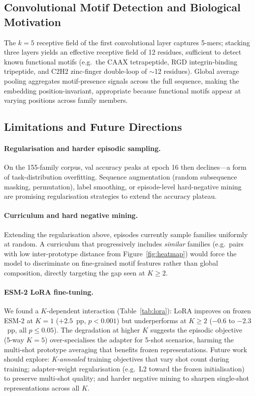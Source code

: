 \documentclass[11pt,a4paper]{article}
\begin{document}
\subsection{Convolutional Motif Detection and Biological Motivation}

The $k=5$ receptive field of the first convolutional layer captures 5-mers;
stacking three layers yields an effective receptive field of 12 residues,
sufficient to detect known functional motifs (e.g.\ the CAAX tetrapeptide, RGD
integrin-binding tripeptide, and C2H2 zinc-finger double-loop of $\sim$12
residues).  Global average pooling aggregates motif-presence signals across the
full sequence, making the embedding position-invariant, appropriate because
functional motifs appear at varying positions across family members.

\subsection{Limitations and Future Directions}
\label{sec:future}

\paragraph{Regularisation and harder episodic sampling.}
On the 155-family corpus, val accuracy peaks at epoch 16 then declines---a form
of task-distribution overfitting.  Sequence augmentation (random subsequence
masking, permutation), label smoothing, or episode-level hard-negative mining
are promising regularisation strategies to extend the accuracy plateau.

\paragraph{Curriculum and hard negative mining.}
Extending the regularisation above, episodes currently sample families uniformly
at random.  A curriculum that progressively includes \emph{similar} families
(e.g.\ pairs with low inter-prototype distance from Figure~\ref{fig:heatmap})
would force the model to discriminate on fine-grained motif features rather than
global composition, directly targeting the gap seen at $K \geq 2$.

\paragraph{ESM-2 LoRA fine-tuning.}
We found a $K$-dependent interaction (Table~\ref{tab:lora}): LoRA improves on
frozen ESM-2 at $K=1$ ($+2.5$~pp, $p < 0.001$) but underperforms at $K \geq 2$
($-0.6$ to $-2.3$~pp, all $p \leq 0.05$).  The degradation at higher $K$
suggests the episodic objective (5-way $K{=}5$) over-specialises the adapter
for 5-shot scenarios, harming the multi-shot prototype averaging that benefits
frozen representations.  Future work should explore: \emph{K-annealed} training
objectives that vary shot count during training; adapter-weight regularisation
(e.g.\ L2 toward the frozen initialisation) to preserve multi-shot quality; and
harder negative mining to sharpen single-shot representations across all $K$.
\end{document}
